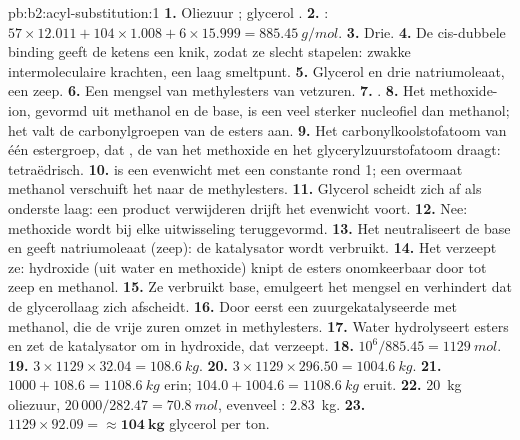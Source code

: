 \begin{solution}{pb:b2:acyl-substitution:1}
\textbf{1.} Oliezuur ; glycerol .
\textbf{2.} : $57 \times 12.011 + 104 \times 1.008 + 6 \times 15.999 = \qty{885.45}{g/mol}$.
\textbf{3.} Drie.
\textbf{4.} De cis-dubbele binding geeft de ketens een knik, zodat ze slecht stapelen: zwakke intermoleculaire krachten, een
laag smeltpunt.
\textbf{5.} Glycerol en drie natriumoleaat, een zeep.
\textbf{6.} Een mengsel van methylesters van vetzuren.
\textbf{7.} .
\textbf{8.} Het methoxide-ion, gevormd uit methanol en de base, is een veel sterker nucleofiel dan
methanol; het valt de carbonylgroepen van de esters aan.
\textbf{9.} Het carbonylkoolstofatoom van één estergroep, dat , de  van het methoxide en het
glycerylzuurstofatoom draagt: tetraëdrisch.
\textbf{10.}  is een evenwicht met een constante rond 1; een overmaat methanol verschuift het
naar de methylesters.
\textbf{11.} Glycerol scheidt zich af als onderste laag: een product verwijderen drijft het evenwicht voort.
\textbf{12.} Nee: methoxide wordt bij elke uitwisseling teruggevormd.
\textbf{13.} Het neutraliseert de base en geeft natriumoleaat (zeep): de katalysator wordt verbruikt.
\textbf{14.} Het verzeept ze: hydroxide (uit water en methoxide) knipt de esters onomkeerbaar door tot zeep en
methanol.
\textbf{15.} Ze verbruikt base, emulgeert het mengsel en verhindert dat de glycerollaag zich afscheidt.
\textbf{16.} Door eerst een zuurgekatalyseerde  met methanol, die de vrije zuren omzet in
methylesters.
\textbf{17.} Water hydrolyseert esters en zet de katalysator om in hydroxide, dat verzeept.
\textbf{18.} $10^6/885.45 = \qty{1129}{mol}$.
\textbf{19.} $3 \times 1129 \times 32.04 = \qty{108.6}{kg}$.
\textbf{20.} $3 \times 1129 \times 296.50 = \qty{1004.6}{kg}$.
\textbf{21.} $1000 + 108.6 = \qty{1108.6}{kg}$ erin; $104.0 + 1004.6 = \qty{1108.6}{kg}$ eruit.
\textbf{22.} \qty{20}{kg} oliezuur, $20\,000/282.47 = \qty{70.8}{mol}$, evenveel :
\qty{2.83}{kg}.
\textbf{23.} $1129 \times 92.09 = \boldsymbol{\approx \qty{104}{kg}}$ glycerol per ton.
\end{solution}
